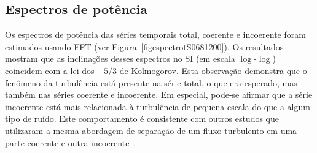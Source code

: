 \subsection{Espectros de potência}

Os espectros de potência das séries temporais total, coerente e incoerente foram estimados usando FFT (ver Figura~\ref{figespectrotS0681200}). Os resultados mostram que as inclinações desses espectros no SI (em escala $\log$-$\log$) coincidem com a lei dos $-5/3$ de Kolmogorov. Esta observação demonstra que o fenômeno da turbulência está presente na série total, o que era esperado, mas também nas séries coerente e incoerente. Em especial, pode-se afirmar que a série incoerente está mais relacionada à turbulência de pequena escala do que a algum tipo de ruído. Este comportamento é consistente com outros estudos que utilizaram a mesma abordagem de separação de um fluxo turbulento em uma parte coerente e outra incoerente~\cite{farge/01}.

